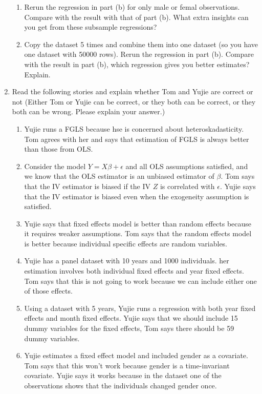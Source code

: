 \documentclass[11pt]{SelfArxOneColBMN}
\begin{document}
\begin{enumerate}
\begin{enumerate}[label=(\alph*)]
    \item Rerun the regression in part (b) for only male or femal observations. Compare with the result with that of part (b). What extra insights can you get from these subsample regressions?
    \item Copy the dataset 5 times and combine them into one dataset (so you have one dataset with 50000 rows). Rerun the regression in part (b). Compare with the result in part (b), which regression gives you better estimates? Explain.
  \end{enumerate}
  \item Read the following stories and explain whether Tom and Yujie are correct or not (Either Tom or Yujie can be correct, or they both can be correct, or they both can be wrong. Please explain your answer.)
  \begin{enumerate}
    \item Yujie runs a FGLS because hse is concerned about heteroskadasticity. Tom agrees with her and says that estimation of FGLS is always better than those from OLS.
    \item Consider the model $Y = X\beta + \epsilon$ and all OLS assumptions satisfied, and we know that the OLS estimator is an unbiased estimator of $\beta$. Tom says that the IV estimator is biased if the IV $Z$ is correlated with $\epsilon$. Yujie says that the IV estimator is biased even when the exogeneity assumption is satisfied.
    \item Yujie says that fixed effects model is better than random effects because it requires weaker assumptions. Tom says that the random effects model is better because individual specific effects are random variables.
    \item Yujie has a panel dataset with 10 years and 1000 individuals. her estimation involves both individual fixed effects and year fixed effects. Tom says that this is not going to work because we can include either one of those effects.
    \item Using a dataset with 5 years, Yujie runs a regression with both year fixed effects and month fixed effects. Yujie says that we should include 15 dummy variables for the fixed effects, Tom says there should be 59 dummy variables.
    \item Yujie estimates a fixed effect model and included gender as a covariate. Tom says that this won't work because gender is a time-invariant covariate. Yujie says it works because in the dataset one of the observations shows that the individuals changed gender once.
  \end{enumerate}
\end{enumerate}
\end{document}

